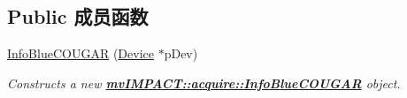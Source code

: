 \subsection*{Public 成员函数}
\begin{DoxyCompactItemize}
\item 
\hyperlink{classmv_i_m_p_a_c_t_1_1acquire_1_1_info_blue_c_o_u_g_a_r_a9811aaf42274ffec10fedec50cb7b3cd}{Info\+Blue\+C\+O\+U\+G\+A\+R} (\hyperlink{classmv_i_m_p_a_c_t_1_1acquire_1_1_device}{Device} $\ast$p\+Dev)
\begin{DoxyCompactList}\small\item\em Constructs a new {\bfseries \hyperlink{classmv_i_m_p_a_c_t_1_1acquire_1_1_info_blue_c_o_u_g_a_r}{mv\+I\+M\+P\+A\+C\+T\+::acquire\+::\+Info\+Blue\+C\+O\+U\+G\+A\+R}} object. \end{DoxyCompactList}\end{DoxyCompactItemize}
